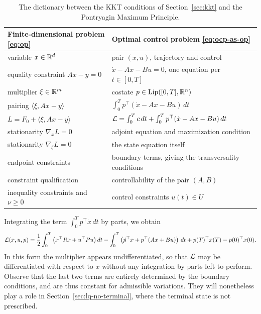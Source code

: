 \begin{table}[ht]
    \centering
    \small
    \begin{tabular}{@{}ll@{}}
        \toprule
        Finite-dimensional problem \eqref{eq:op}                & Optimal control problem \eqref{eq:ocp-as-op}                       \\
        \midrule
        variable $x\in\mathbb{R}^d$                                   & pair $(x,u)$, trajectory and control                               \\
        equality constraint $Ax-y=0$                            & $\dot x - Ax-Bu=0$, one equation per $t\in[0,T]$                   \\
        multiplier $\xi\in\mathbb{R}^m$                               & costate $p\in \operatorname{Lip}([0,T],\mathbb{R}^n)$                                  \\
        pairing $\langle \xi, Ax-y\rangle$                      & $\int_0^T p^\top(\dot x - Ax-Bu)\, dt$                             \\
        $L = F_0 + \langle \xi, Ax-y\rangle$                    & $\mathcal{L} = \int_0^T c\, dt + \int_0^T p^\top(\dot x - Ax-Bu)\, dt$    \\
        stationarity $\nabla_x L=0$                             & adjoint equation and maximization condition                        \\
        stationarity $\nabla_\xi L = 0$                         & the state equation itself                                          \\
        endpoint constraints                                    & boundary terms, giving the transversality conditions               \\
        constraint qualification                                & controllability of the pair $(A,B)$                                \\
        inequality constraints and $\nu\ge0$                    & control constraints $u(t)\in U$                                    \\
        \bottomrule
    \end{tabular}
    \caption{The dictionary between the KKT conditions of Section~\ref{sec:kkt} and the Pontryagin Maximum Principle.}
    \label{tab:kkt-pmp}
\end{table}

Integrating the term $\int_0^T p^\top \dot x\, dt$ by parts, we obtain
\begin{equation}
    \label{eq:ocp-lagrangian-ibp}
    \mathcal{L}(x,u,p)
    = \frac12 \int_0^T \big( x^\top R x + u^\top P u \big)\, dt
    - \int_0^T \left( \dot p^\top x + p^\top (A x + B u) \right)\, dt
    + p(T)^\top x(T) - p(0)^\top x(0).
\end{equation}
In this form the multiplier appears undifferentiated, so that $\mathcal{L}$ may be differentiated with respect to $x$ without any integration by parts left to perform. Observe that the last two terms are entirely determined by the boundary conditions, and are thus constant for admissible variations. They will nonetheless play a role in Section~\ref{sec:lq-no-terminal}, where the terminal state is not prescribed.

